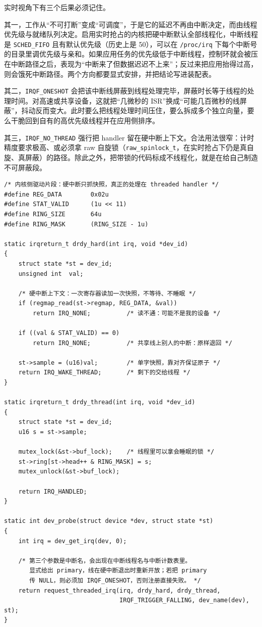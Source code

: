 \documentclass[12pt,a4paper,fontset=fandol]{ctexbook}
\newcommand{\Tp}[1]{\texttt{#1}}
\begin{document}
实时视角下有三个后果必须记住。

其一，工作从``不可打断''变成``可调度''，于是它的延迟不再由中断决定，而由线程优先级与就绪队列决定。启用实时抢占的内核把硬中断默认全部线程化，中断线程是 \Tp{SCHED\_FIFO} 且有默认优先级（历史上是 50），可以在 \Tp{/proc/irq} 下每个中断号的目录里调优先级与亲和。如果应用任务的优先级低于中断线程，控制环就会被压在中断路径之后，表现为``中断来了但数据迟迟不上来''；反过来把应用抬得过高，则会饿死中断路径。两个方向都要显式安排，并把结论写进装配表。

其二，\Tp{IRQF\_ONESHOT} 会把该中断线屏蔽到线程处理完毕，屏蔽时长等于线程的处理时间。对高速或共享设备，这就把``几微秒的 ISR''换成``可能几百微秒的线屏蔽''，抖动反而变大。此时要么把线程处理时间压住，要么拆成多个独立向量，要么干脆回到自有的高优先级线程并在应用侧排序。

其三，\Tp{IRQF\_NO\_THREAD} 强行把 handler 留在硬中断上下文。合法用法很窄：计时精度要求极高、或必须拿 raw 自旋锁（\Tp{raw\_spinlock\_t}，在实时抢占下仍是真自旋、真屏蔽）的路径。除此之外，把带锁的代码标成不线程化，就是在给自己制造不可屏蔽段。

\begin{lstlisting}[style=cstyle,caption={C：request\_threaded\_irq 的最小可用形态（独立向量、显式 primary）},label={lst:ch03-threaded-irq}]
/* 内核侧驱动片段：硬中断只抓快照，真正的处理在 threaded handler */
#define REG_DATA        0x02u
#define STAT_VALID      (1u << 11)
#define RING_SIZE       64u
#define RING_MASK       (RING_SIZE - 1u)

static irqreturn_t drdy_hard(int irq, void *dev_id)
{
    struct state *st = dev_id;
    unsigned int  val;

    /* 硬中断上下文：一次寄存器读加一次快照，不等待、不睡眠 */
    if (regmap_read(st->regmap, REG_DATA, &val))
        return IRQ_NONE;          /* 读不通：可能不是我的设备 */

    if ((val & STAT_VALID) == 0)
        return IRQ_NONE;          /* 共享线上别人的中断：原样退回 */

    st->sample = (u16)val;        /* 单字快照，靠对齐保证原子 */
    return IRQ_WAKE_THREAD;       /* 剩下的交给线程 */
}

static irqreturn_t drdy_thread(int irq, void *dev_id)
{
    struct state *st = dev_id;
    u16 s = st->sample;

    mutex_lock(&st->buf_lock);    /* 线程里可以拿会睡眠的锁 */
    st->ring[st->head++ & RING_MASK] = s;
    mutex_unlock(&st->buf_lock);

    return IRQ_HANDLED;
}

static int dev_probe(struct device *dev, struct state *st)
{
    int irq = dev_get_irq(dev, 0);

    /* 第三个参数是中断名，会出现在中断线程名与中断计数表里。
       显式给出 primary，线在硬中断退出时重新开放；若把 primary
       传 NULL，则必须加 IRQF_ONESHOT，否则注册直接失败。 */
    return request_threaded_irq(irq, drdy_hard, drdy_thread,
                                IRQF_TRIGGER_FALLING, dev_name(dev), st);
}
\end{lstlisting}
\end{document}
